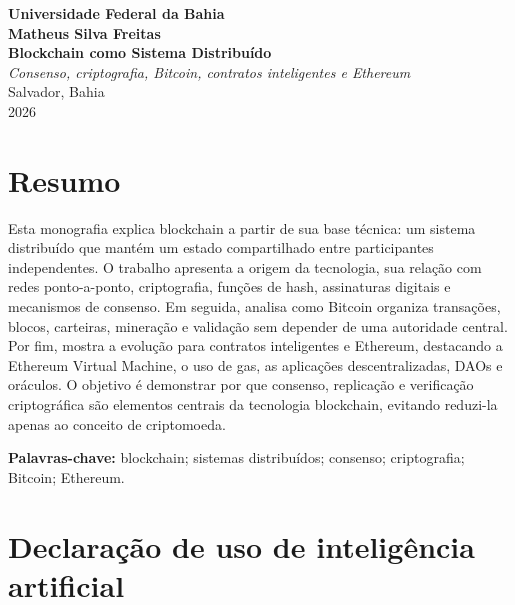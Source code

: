 \documentclass[12pt,a4paper]{report}
\begin{document}

\begin{titlepage}
\begin{center}
{\large\textbf{Universidade Federal da Bahia}}\\[2cm]
{\Large\textbf{Matheus Silva Freitas}}\\[3cm]
{\LARGE\textbf{Blockchain como Sistema Distribuído}}\\[0.5cm]
{\large\textit{Consenso, criptografia, Bitcoin, contratos inteligentes e Ethereum}}\\[4cm]
\vfill
{\large Salvador, Bahia}\\[0.3cm]
{\large 2026}
\end{center}
\end{titlepage}

\chapter*{Resumo}

Esta monografia explica blockchain a partir de sua base técnica: um sistema distribuído que mantém um estado compartilhado entre participantes independentes. O trabalho apresenta a origem da tecnologia, sua relação com redes ponto-a-ponto, criptografia, funções de hash, assinaturas digitais e mecanismos de consenso. Em seguida, analisa como Bitcoin organiza transações, blocos, carteiras, mineração e validação sem depender de uma autoridade central. Por fim, mostra a evolução para contratos inteligentes e Ethereum, destacando a Ethereum Virtual Machine, o uso de gas, as aplicações descentralizadas, DAOs e oráculos. O objetivo é demonstrar por que consenso, replicação e verificação criptográfica são elementos centrais da tecnologia blockchain, evitando reduzi-la apenas ao conceito de criptomoeda.

\textbf{Palavras-chave:} blockchain; sistemas distribuídos; consenso; criptografia; Bitcoin; Ethereum.

\chapter*{Declaração de uso de inteligência artificial}
\end{document}
